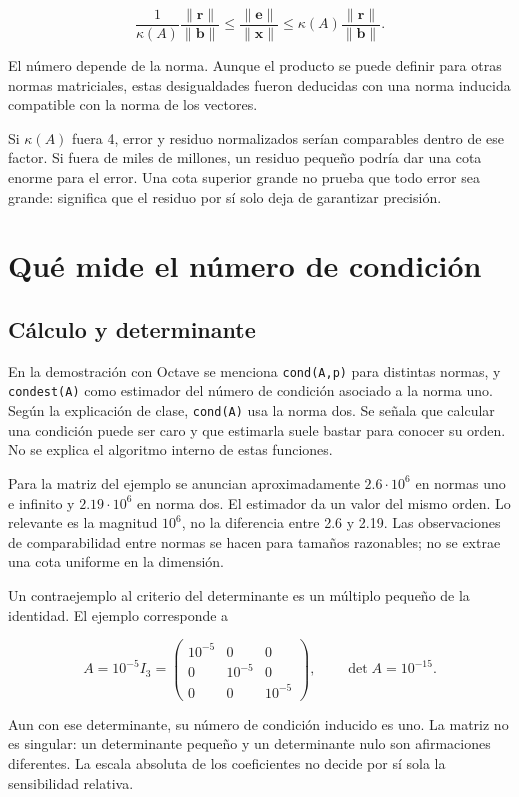 \documentclass[12pt,a4paper]{article}
\begin{document}
\[
\boxed{
\frac1{\kappa(A)}\frac{\|\mathbf r\|}{\|\mathbf b\|}
\le\frac{\|\mathbf e\|}{\|\mathbf x\|}
\le\kappa(A)\frac{\|\mathbf r\|}{\|\mathbf b\|}}.
\]

El número depende de la norma. Aunque el producto se puede definir para otras normas matriciales, estas desigualdades fueron deducidas con una norma inducida compatible con la norma de los vectores.

Si $\kappa(A)$ fuera 4, error y residuo normalizados serían comparables dentro de ese factor. Si fuera de miles de millones, un residuo pequeño podría dar una cota enorme para el error. Una cota superior grande no prueba que todo error sea grande: significa que el residuo por sí solo deja de garantizar precisión.

\section{Qué mide el número de condición}

\subsection{Cálculo y determinante}

En la demostración con Octave se menciona \texttt{cond(A,p)} para distintas normas, y \texttt{condest(A)} como estimador del número de condición asociado a la norma uno. Según la explicación de clase, \texttt{cond(A)} usa la norma dos. Se señala que calcular una condición puede ser caro y que estimarla suele bastar para conocer su orden. No se explica el algoritmo interno de estas funciones.

Para la matriz del ejemplo se anuncian aproximadamente $2.6\cdot10^6$ en normas uno e infinito y $2.19\cdot10^6$ en norma dos. El estimador da un valor del mismo orden. Lo relevante es la magnitud $10^6$, no la diferencia entre 2.6 y 2.19. Las observaciones de comparabilidad entre normas se hacen para tamaños razonables; no se extrae una cota uniforme en la dimensión.

Un contraejemplo al criterio del determinante es un múltiplo pequeño de la identidad. El ejemplo corresponde a

\[
A=10^{-5}I_3=
\begin{pmatrix}10^{-5}&0&0\\0&10^{-5}&0\\0&0&10^{-5}\end{pmatrix},
\qquad \det A=10^{-15}.
\]

Aun con ese determinante, su número de condición inducido es uno. La matriz no es singular: un determinante pequeño y un determinante nulo son afirmaciones diferentes. La escala absoluta de los coeficientes no decide por sí sola la sensibilidad relativa.
\end{document}

